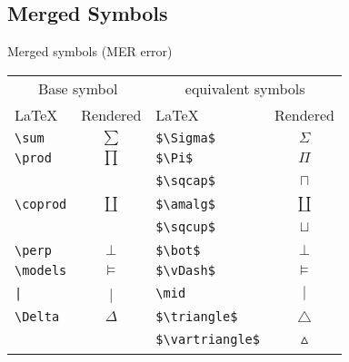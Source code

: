 \subsection{Merged Symbols}
\begin{frame}[fragile]{Merged symbols (MER error)}
\begin{table}[ht]
    \centering
    \begin{tabular}{lc|lc}
        \toprule
        \multicolumn{2}{c}{Base symbol} & \multicolumn{2}{c}{equivalent symbols}\\
        \LaTeX         & Rendered       & \LaTeX                 & Rendered  \\\midrule
        \verb+\sum+    & $\sum$         & \verb+$\Sigma$+        & $\Sigma$\\
        \verb+\prod+   & $\prod$        & \verb+$\Pi$+           & $\Pi$\\
        ~              & ~              & \verb+$\sqcap$+        & $\sqcap$\\
        \verb+\coprod+ & $\coprod$      & \verb+$\amalg$+        & $\amalg$\\
        ~              & ~              & \verb+$\sqcup$+        & $\sqcup$\\
        \verb+\perp+   & $\perp$        & \verb+$\bot$+          & $\bot$\\
        \verb+\models+ & $\models$      & \verb+$\vDash$+        & $\vDash$\\
        \verb+|+       & |              & \verb+\mid+            & $\mid$  \\
        \verb+\Delta+  & $\Delta$       & \verb+$\triangle$+     & $\triangle$\\
        ~              & ~              & \verb+$\vartriangle$+  & $\vartriangle$\\
        \bottomrule
    \end{tabular}
\end{table}
\end{frame}

